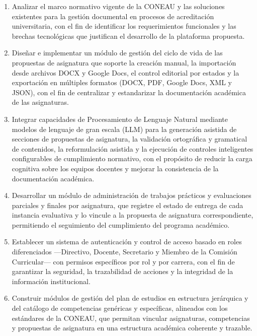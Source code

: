 \begin{enumerate}
    \item Analizar el marco normativo vigente de la CONEAU y las soluciones existentes para la gesti\'{o}n documental en procesos de acreditaci\'{o}n universitaria, con el fin de identificar los requerimientos funcionales y las brechas tecnol\'{o}gicas que justifican el desarrollo de la plataforma propuesta.

    \item Dise\~{n}ar e implementar un m\'{o}dulo de gesti\'{o}n del ciclo de vida de las propuestas de asignatura que soporte la creaci\'{o}n manual, la importaci\'{o}n desde archivos DOCX y Google Docs, el control editorial por estados y la exportaci\'{o}n en m\'{u}ltiples formatos (DOCX, PDF, Google Docs, XML y JSON), con el fin de centralizar y estandarizar la documentaci\'{o}n acad\'{e}mica de las asignaturas.

    \item Integrar capacidades de Procesamiento de Lenguaje Natural mediante modelos de lenguaje de gran escala (LLM) para la generaci\'{o}n asistida de secciones de propuestas de asignatura, la validaci\'{o}n ortogr\'{a}fica y gramatical de contenidos, la reformulaci\'{o}n asistida y la ejecuci\'{o}n de controles inteligentes configurables de cumplimiento normativo, con el prop\'{o}sito de reducir la carga cognitiva sobre los equipos docentes y mejorar la consistencia de la documentaci\'{o}n acad\'{e}mica.

    \item Desarrollar un m\'{o}dulo de administraci\'{o}n de trabajos pr\'{a}cticos y evaluaciones parciales y finales por asignatura, que registre el estado de entrega de cada instancia evaluativa y lo vincule a la propuesta de asignatura correspondiente, permitiendo el seguimiento del cumplimiento del programa acad\'{e}mico.

    \item Establecer un sistema de autenticaci\'{o}n y control de acceso basado en roles diferenciados ---Directivo, Docente, Secretario y Miembro de la Comisi\'{o}n Curricular--- con permisos espec\'{i}ficos por rol y por carrera, con el fin de garantizar la seguridad, la trazabilidad de acciones y la integridad de la informaci\'{o}n institucional.

    \item Construir m\'{o}dulos de gesti\'{o}n del plan de estudios en estructura jer\'{a}rquica y del cat\'{a}logo de competencias gen\'{e}ricas y espec\'{i}ficas, alineados con los est\'{a}ndares de la CONEAU, que permitan vincular asignaturas, competencias y propuestas de asignatura en una estructura acad\'{e}mica coherente y trazable.


\end{enumerate}
